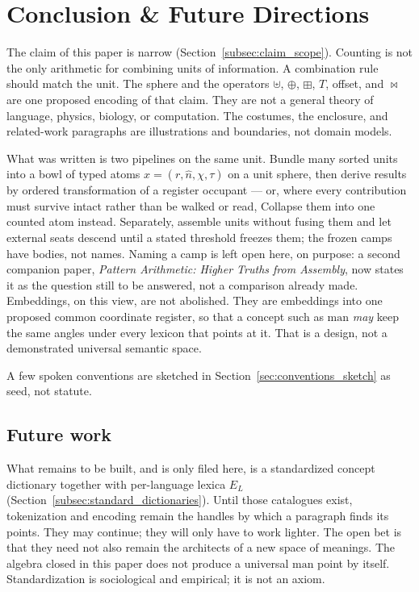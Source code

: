 \documentclass[12pt, a4paper]{article}
\begin{document}
\section{Conclusion \& Future Directions}
\label{sec:conclusion}

The claim of this paper is narrow
(Section~\ref{subsec:claim_scope}). Counting is not the only
arithmetic for combining units of information. A combination rule
should match the unit. The sphere and the operators
$\uplus$, $\oplus$, $\boxplus$, $T$, offset, and $\bowtie$ are one proposed
encoding of that claim. They are not a general theory of language,
physics, biology, or computation. The costumes, the enclosure, and
related-work paragraphs are illustrations and boundaries, not domain
models.

What was written is two pipelines on the same unit. Bundle many
sorted units into a bowl of typed atoms $x=(r,\hat n,\chi,\tau)$ on a
unit sphere, then derive results by ordered transformation of a
register occupant --- or, where every contribution must survive
intact rather than be walked or read, Collapse them into one counted
atom instead. Separately, assemble units without fusing them
and let external seats descend until a stated threshold freezes
them; the frozen camps have bodies, not names. Naming a camp is
left open here, on purpose: a second companion paper,
\emph{Pattern Arithmetic: Higher Truths from Assembly}, now states
it as the question still to be answered, not a comparison already
made.
Embeddings, on this view, are
not abolished. They are embeddings into one proposed common coordinate
register, so that a
concept such as $\mathrm{man}$ \emph{may} keep the same angles under every
lexicon that points at it. That is a design, not a demonstrated
universal semantic space.

A few spoken conventions are sketched in
Section~\ref{sec:conventions_sketch} as seed, not statute.

\subsection{Future work}
\label{subsec:future_work}
What remains to be built, and is only filed here, is a standardized
concept dictionary together with per-language lexica $E_L$
(Section~\ref{subsec:standard_dictionaries}). Until those catalogues
exist, tokenization and encoding remain the handles by which a
paragraph finds its points. They may continue; they will only have to
work lighter. The open bet is that they need not also
remain the architects of a new space of meanings.
The algebra closed in this paper does not produce a universal
$\mathrm{man}$ point by itself. Standardization is sociological and
empirical; it is not an axiom.
\end{document}
